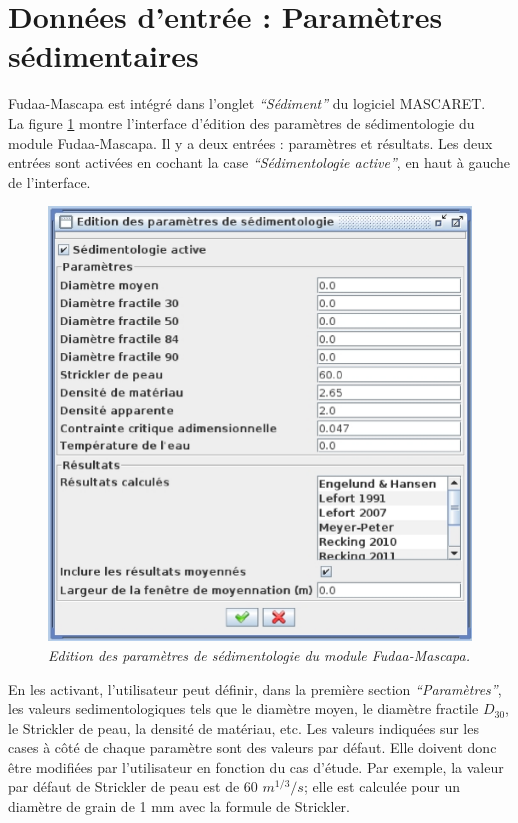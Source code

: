 \documentclass[a4paper,10pt]{article}
\begin{document}
\section{Donn\'ees d'entr\'ee : Param\`etres s\'edimentaires}

\noindent
Fudaa-Mascapa est int\'egr\'e dans l'onglet \emph{``S\'ediment''} du logiciel MASCARET. \\

\noindent
La figure \ref{fig} montre l'interface d'\'edition des param\`etres de s\'edimentologie du module Fudaa-Mascapa. Il y a deux entr\'ees : param\`etres et r\'esultats. Les deux entr\'ees sont activ\'ees en cochant la case \emph{``S\'edimentologie active''}, en haut \`a gauche de l'interface. \\

\begin{figure}[h]
 \begin{center}
  \includegraphics[scale=0.35]{mascapa}
  \caption{\label{fig}
  		   \textit{Edition des param\`etres de s\'edimentologie du module Fudaa-Mascapa.}}
 \end{center}
\end{figure}

\noindent
En les activant, l'utilisateur peut d\'efinir, dans la premi\`ere section \emph{``Param\`etres''}, les valeurs sedimentologiques tels que le diam\`etre moyen, le diam\`etre fractile $D_{30}$, le Strickler de peau, la densit\'e de mat\'eriau, etc. Les valeurs indiqu\'ees sur les cases \`a c\^ot\'e de chaque param\`etre sont des valeurs par d\'efaut. Elle doivent donc \^etre modifi\'ees par l'utilisateur en fonction du cas d'\'etude. Par exemple, la valeur par d\'efaut de Strickler de peau est de 60 $m^{1/3}/s$; elle est calcul\'ee pour un diam\`etre de grain de 1 mm avec la formule de Strickler. \\
\end{document}

